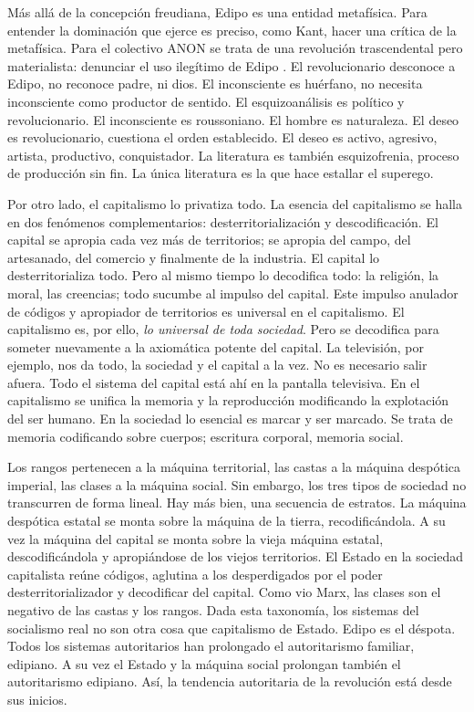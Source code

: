 Más allá de la concepción freudiana, Edipo es una entidad metafísica. Para entender la dominación que ejerce es preciso, como Kant, hacer una crítica de la metafísica. Para el colectivo ANON se trata de una revolución trascendental pero materialista: denunciar el uso ilegítimo de Edipo \autocite{AltWokeCompanion2017}. El revolucionario desconoce a Edipo, no reconoce padre, ni dios. El inconsciente es huérfano, no necesita inconsciente como productor de sentido. El esquizoanálisis es político y revolucionario. El inconsciente es roussoniano. El hombre es naturaleza. El deseo es revolucionario, cuestiona el orden establecido. El deseo es activo, agresivo, artista, productivo, conquistador. La literatura es también esquizofrenia, proceso de producción sin fin. La única literatura es la que hace estallar el superego.

Por otro lado, el capitalismo lo privatiza todo. La esencia del capitalismo se halla en dos fenómenos complementarios: desterritorialización y descodificación. El capital se apropia cada vez más de territorios; se apropia del campo, del artesanado, del comercio y finalmente de la industria. El capital lo desterritorializa todo. Pero al mismo tiempo lo decodifica todo: la religión, la moral, las creencias; todo sucumbe al impulso del capital. Este impulso anulador de códigos y apropiador de territorios es universal en el capitalismo. El capitalismo es, por ello, \emph{lo universal de toda sociedad}. Pero se decodifica para someter nuevamente a la axiomática potente del capital. La televisión, por ejemplo, nos da todo, la sociedad y el capital a la vez. No es necesario salir afuera. Todo el sistema del capital está ahí en la pantalla televisiva. En el capitalismo se unifica la memoria y la reproducción modificando la explotación del ser humano. En la sociedad lo esencial es marcar y ser marcado. Se trata de memoria codificando sobre cuerpos; escritura corporal, memoria social.

Los rangos pertenecen a la máquina territorial, las castas a la máquina despótica imperial, las clases a la máquina social. Sin embargo, los tres tipos de sociedad no transcurren de forma lineal. Hay más bien, una secuencia de estratos. La máquina despótica estatal se monta sobre la máquina de la tierra, recodificándola. A su vez la máquina del capital se monta sobre la vieja máquina estatal, descodificándola y apropiándose de los viejos territorios. El Estado en la sociedad capitalista reúne códigos, aglutina a los desperdigados por el poder desterritorializador y decodificar del capital. Como vio Marx, las clases son el negativo de las castas y los rangos. Dada esta taxonomía, los sistemas del socialismo real no son otra cosa que capitalismo de Estado. Edipo es el déspota. Todos los sistemas autoritarios han prolongado el autoritarismo familiar, edipiano. A su vez el Estado y la máquina social prolongan también el autoritarismo edipiano. Así, la tendencia autoritaria de la revolución está desde sus inicios.

